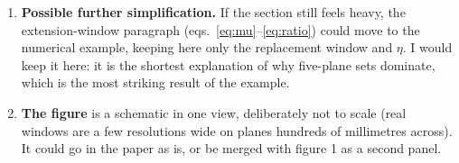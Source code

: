 \documentclass[a4paper,11pt]{article}
\begin{document}
\begin{enumerate}
\item \textbf{Possible further simplification.} If the section still feels heavy, the
  extension-window paragraph (eqs.~\eqref{eq:mu}--\eqref{eq:ratio}) could move to the numerical
  example, keeping here only the replacement window and $\eta$. I would keep it here: it is the
  shortest explanation of why five-plane sets dominate, which is the most striking result of
  the example.

\item \textbf{The figure} is a schematic in one view, deliberately not to scale (real windows
  are a few resolutions wide on planes hundreds of millimetres across). It could go in the
  paper as is, or be merged with figure 1 as a second panel.
\end{enumerate}
\end{document}
